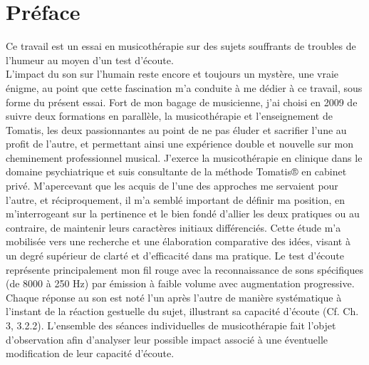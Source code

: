 \chapter*{Préface}
Ce travail est un essai  en musicothérapie sur des sujets souffrants de troubles de 
l'humeur au moyen d'un test d'écoute. 
\\
 L'impact du son sur l'humain reste encore et toujours un mystère, une vraie énigme, au point que cette  
 fascination %
 m'a conduite à me dédier à ce travail, sous forme du 
 présent essai.
 Fort de mon bagage de musicienne, j'ai choisi en 2009  de suivre deux formations en parallèle,  
 la musicothérapie et l'enseignement de  Tomatis, les deux passionnantes au point de ne pas éluder et 
 sacrifier l'une au profit de l'autre, et permettant ainsi une expérience double et nouvelle sur mon 
 cheminement professionnel musical.
 J'exerce  la musicothérapie en clinique dans le domaine psychiatrique et suis consultante de la 
 méthode 
 Tomatis® en cabinet privé. M'apercevant que les 
 acquis de l'une des approches me servaient  pour l'autre, et réciproquement,
 il m'a semblé important de définir ma position, en m'interrogeant  sur la pertinence et le bien fondé 
 d'allier les deux pratiques 
 ou au contraire, de maintenir  leurs caractères initiaux différenciés. Cette étude m'a mobilisée vers une 
 recherche et une élaboration comparative  des idées, visant à un degré supérieur de clarté et d'efficacité 
 dans ma pratique.
 Le test d'écoute représente principalement mon fil rouge avec la  reconnaissance de sons 
 spécifiques (de 8000 à 250 Hz) par émission à faible volume avec augmentation progressive.
 Chaque réponse au son est noté l'un après l'autre de manière systématique à l'instant de la réaction 
 gestuelle du sujet,
  illustrant  sa capacité d'écoute (Cf. Ch. 3, 3.2.2). 
 L'ensemble des séances individuelles de musicothérapie fait  l'objet d'observation afin d'analyser 
 leur possible impact associé à une éventuelle modification de leur capacité d'écoute.
